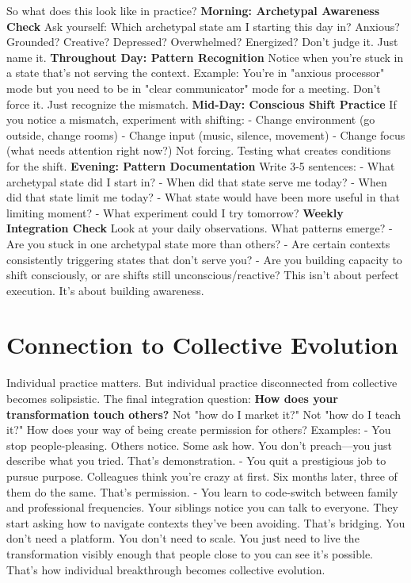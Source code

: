 So what does this look like in practice?
\textbf{Morning: Archetypal Awareness Check}
Ask yourself: Which archetypal state am I starting this day in?
Anxious? Grounded? Creative? Depressed? Overwhelmed? Energized?
Don't judge it. Just name it.
\textbf{Throughout Day: Pattern Recognition}
Notice when you're stuck in a state that's not serving the context.
Example: You're in "anxious processor" mode but you need to be in "clear communicator" mode for a meeting.
Don't force it. Just recognize the mismatch.
\textbf{Mid-Day: Conscious Shift Practice}
If you notice a mismatch, experiment with shifting:
- Change environment (go outside, change rooms)
- Change input (music, silence, movement)
- Change focus (what needs attention right now?)
Not forcing. Testing what creates conditions for the shift.
\textbf{Evening: Pattern Documentation}
Write 3-5 sentences:
- What archetypal state did I start in?
- When did that state serve me today?
- When did that state limit me today?
- What state would have been more useful in that limiting moment?
- What experiment could I try tomorrow?
\textbf{Weekly Integration Check}
Look at your daily observations. What patterns emerge?
- Are you stuck in one archetypal state more than others?
- Are certain contexts consistently triggering states that don't serve you?
- Are you building capacity to shift consciously, or are shifts still unconscious/reactive?
This isn't about perfect execution. It's about building awareness.

\section{Connection to Collective Evolution}

Individual practice matters. But individual practice disconnected from collective becomes solipsistic.
The final integration question:
\textbf{How does your transformation touch others?}
Not "how do I market it?" Not "how do I teach it?" How does your way of being create permission for others?
Examples:
- You stop people-pleasing. Others notice. Some ask how. You don't preach—you just describe what you tried. That's demonstration.
- You quit a prestigious job to pursue purpose. Colleagues think you're crazy at first. Six months later, three of them do the same. That's permission.
- You learn to code-switch between family and professional frequencies. Your siblings notice you can talk to everyone. They start asking how to navigate contexts they've been avoiding. That's bridging.
You don't need a platform. You don't need to scale.
You just need to live the transformation visibly enough that people close to you can see it's possible.
That's how individual breakthrough becomes collective evolution.

